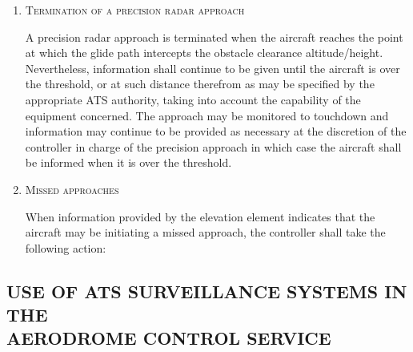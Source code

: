 \begin{enumeratesc}
\begin{enumerate}[labelindent=0pt,itemsep=0.2cm]
        \item \textsc{Termination of a precision radar approach}
        \par\noindent A precision radar approach is terminated when the aircraft reaches the point at which the glide path intercepts the obstacle clearance altitude/height. Nevertheless, information shall continue to be given until the aircraft is over the threshold, or at such distance therefrom as may be specified by the appropriate ATS authority, taking into account the capability of the equipment concerned. The approach may be monitored to touchdown and information may continue to be provided as necessary at the discretion of the controller in charge of the precision approach in which case the aircraft shall be informed when it is over the threshold.

        \item \textsc{Missed approaches}
        \par\noindent When information provided by the elevation element indicates that the aircraft may be initiating a missed approach, the controller shall take the following action:
    \end{enumerate}
\end{enumeratesc}

\subsection[Use of ATS surveillance systems in the aerodrome control service]{USE OF ATS SURVEILLANCE SYSTEMS IN THE \\ AERODROME CONTROL SERVICE}

